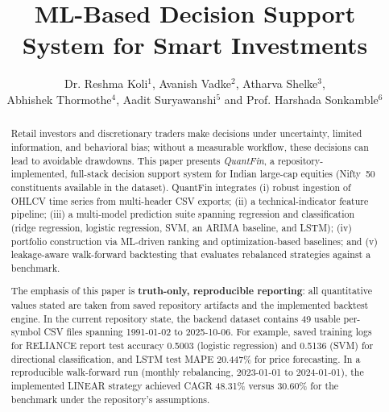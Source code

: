 \documentclass{svproc}
\begin{document}
\mainmatter

\title{ML-Based Decision Support System for Smart Investments}

\author{Dr. Reshma Koli$^{1}$, Avanish Vadke$^{2}$, Atharva Shelke$^{3}$,\\
Abhishek Thormothe$^{4}$, Aadit Suryawanshi$^{5}$ and Prof. Harshada Sonkamble$^{6}$}


\maketitle

\begin{abstract}
Retail investors and discretionary traders make decisions under uncertainty, limited information, and behavioral bias; without a measurable workflow, these decisions can lead to avoidable drawdowns. This paper presents \emph{QuantFin}, a repository-implemented, full-stack decision support system for Indian large-cap equities (Nifty~50 constituents available in the dataset). QuantFin integrates (i) robust ingestion of OHLCV time series from multi-header CSV exports; (ii) a technical-indicator feature pipeline; (iii) a multi-model prediction suite spanning regression and classification (ridge regression, logistic regression, SVM, an ARIMA baseline, and LSTM); (iv) portfolio construction via ML-driven ranking and optimization-based baselines; and (v) leakage-aware walk-forward backtesting that evaluates rebalanced strategies against a benchmark.

The emphasis of this paper is \textbf{truth-only, reproducible reporting}: all quantitative values stated are taken from saved repository artifacts and the implemented backtest engine. In the current repository state, the backend dataset contains 49 usable per-symbol CSV files spanning 1991-01-02 to 2025-10-06. For example, saved training logs for RELIANCE report test accuracy 0.5003 (logistic regression) and 0.5136 (SVM) for directional classification, and LSTM test MAPE 20.447\% for price forecasting. In a reproducible walk-forward run (monthly rebalancing, 2023-01-01 to 2024-01-01), the implemented LINEAR strategy achieved CAGR 48.31\% versus 30.60\% for the benchmark under the repository's assumptions.

\end{abstract}
\end{document}
